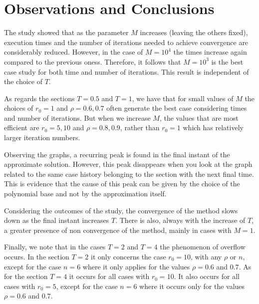 \documentclass[a4paper,11pt,openright]{report}
\begin{document}
\section{Observations and Conclusions}
The study showed that as the parameter $M$ increases (leaving the others fixed), execution times and the number of iterations needed to achieve convergence are considerably reduced. However, in the case of $M = 10^4$ the times increase again compared to the previous oness. Therefore, it follows that $M=10^3$ is the best case study for both time and number of iterations. This result is independent of the choice of $T$.

As regards the sections $T = 0.5$ and $T =1$, we have that for small values of $M$ the choices of $r_0 = 1$ and $\rho = 0.6, 0.7$ often generate the best case considering times and number of iterations. But when we increase $M$, the values that are most efficient are $r_0=5, 10$ and $\rho = 0.8, 0.9$, rather than $r_0=1$ which has relatively larger iteration numbers.

Observing the graphs, a recurring peak is found in the final instant of the approximate solution. However, this peak disappears when you look at the graph related to the same case history belonging to the section with the next final time. This is evidence that the cause of this peak can be given by the choice of the polynomial base and not by the approximation itself.

Considering the outcomes of the study, the convergence of the method slows down as the final instant increases $T$. There is also, always with the increase of $T$, a greater presence of non convergence of the method, mainly in cases with $M=1$. 

Finally, we note that in the cases $T = 2$ and $T = 4$ the phenomenon of overflow occurs. In the section $T = 2$ it only concerns the case $r_0 = 10$, with any $\rho$ or $n$, except for the case $n = 6$ where it only applies for the values $\rho = 0.6$ and $0.7$. As for the section $T = 4$ it occurs for all cases with $r_0 = 10$. It also occurs for all cases with $r_0 = 5$, except for the case $n = 6$ where it occurs only for the values $\rho = 0.6$ and $0.7$.
\end{document}
